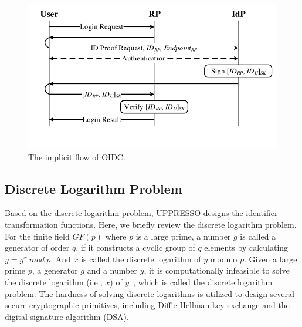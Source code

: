 \begin{figure}[t]
  \centering
  \includegraphics[width=0.90\linewidth]{fig/OIDC1.pdf}
  \caption{The implicit flow of OIDC.}
  \label{fig:OpenID}
\end{figure}

\subsection{Discrete Logarithm Problem}
\label{sec:dlp}

Based on the discrete logarithm problem, UPPRESSO designs the identifier-transformation functions. %
Here, we briefly review the discrete logarithm problem.
For the finite field $GF(p)$ where $p$ is a large prime, a number $g$ is called a generator of order $q$, if it constructs a cyclic  group of $q$ elements by calculating $y=g^x \ mod\ p$.
And $x$ is called the discrete logarithm of $y$ modulo $p$. Given a large prime $p$, a generator $g$ and a number $y$, it is computationally infeasible to solve the discrete logarithm (i.e., $x$) of $y$~\cite{WXWM}, which is called the discrete logarithm problem.
The hardness of solving discrete logarithms is utilized to design several secure cryptographic primitives, including Diffie-Hellman key exchange and the digital signature algorithm (DSA).

